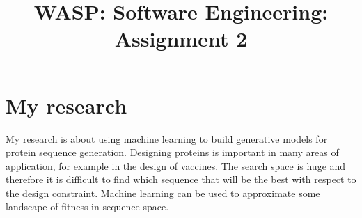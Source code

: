 \documentclass{article}
\title{WASP: Software Engineering: Assignment 2}
\begin{document}
\maketitle


\section{My research}
My research is about using machine learning to build generative models for protein sequence generation. Designing proteins is important in many areas of application, for example in the design of vaccines. The search space is huge and therefore it is difficult to find which sequence that will be the best with respect to the design constraint. Machine learning can be used to approximate some landscape of fitness in sequence space.
\end{document}
